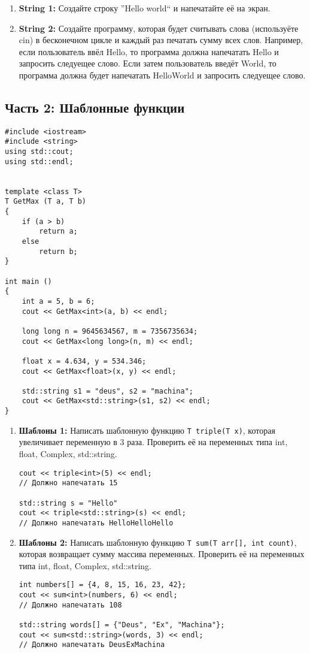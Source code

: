 \documentclass{article}
\begin{document}
\begin{enumerate}
\item \textbf{String 1:} Создайте строку ''Hello world`` и напечатайте её на экран.
\item \textbf{String 2:} Создайте программу, которая будет считывать слова (используёте cin) в бесконечном цикле и каждый раз печатать сумму всех слов. Например, если пользователь ввёл Hello, то программа должна напечатать Hello и запросить следуещее слово. Если затем пользователь введёт World, то программа должна будет напечатать HelloWorld и запросить следуещее слово.
\end{enumerate}

\newpage
\subsection*{Часть 2: Шаблонные функции}

\begin{lstlisting}
#include <iostream>
#include <string>
using std::cout;
using std::endl;


template <class T>
T GetMax (T a, T b) 
{
    if (a > b)
    	return a;
    else 
    	return b;
}

int main () 
{
    int a = 5, b = 6;
    cout << GetMax<int>(a, b) << endl;
    
    long long n = 9645634567, m = 7356735634;
    cout << GetMax<long long>(n, m) << endl;
    
    float x = 4.634, y = 534.346;
    cout << GetMax<float>(x, y) << endl;
    
    std::string s1 = "deus", s2 = "machina";
    cout << GetMax<std::string>(s1, s2) << endl;
}
\end{lstlisting}
\begin{enumerate}
\item \textbf{Шаблоны 1:} Написать шаблонную функцию \texttt{T triple(T x)}, которая увеличивает переменную в 3 раза. Проверить её на переменных типа int, float, Complex, std::string.
\begin{lstlisting}
cout << triple<int>(5) << endl;
// Должно напечатать 15
    
std::string s = "Hello"
cout << triple<std::string>(s) << endl;
// Должно напечатать HelloHelloHello
\end{lstlisting}
\item \textbf{Шаблоны 2:} Написать шаблонную функцию \texttt{T sum(T arr[], int count)}, которая возвращает сумму массива переменных. Проверить её на переменных типа int, float, Complex, std::string.
\begin{lstlisting}
int numbers[] = {4, 8, 15, 16, 23, 42};
cout << sum<int>(numbers, 6) << endl;
// Должно напечатать 108
    
std::string words[] = {"Deus", "Ex", "Machina"};
cout << sum<std::string>(words, 3) << endl;
// Должно напечатать DeusExMachina
\end{lstlisting}
\end{enumerate}
\end{document}
